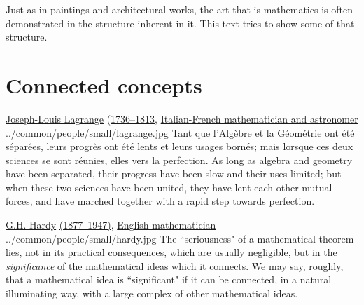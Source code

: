 Just as in paintings and architectural works, 
the art that is mathematics is often demonstrated in the structure inherent in it.
This text tries to show some of that structure.

\section*{Connected concepts}

\qboxnpqt
  { \href{http://en.wikipedia.org/wiki/Joseph_Louis_Lagrange}{Joseph-Louis Lagrange}
    (\href{http://www-history.mcs.st-andrews.ac.uk/Timelines/TimelineD.html}{1736--1813},
     \href{http://www-history.mcs.st-andrews.ac.uk/BirthplaceMaps/Places/Italy.html}{Italian-French mathematician and astronomer}
    \footnotemark
  }
  {../common/people/small/lagrange.jpg}
  {Tant que l'Alg\`ebre et la G\'eom\'etrie ont \'et\'e s\'epar\'ees,
   leurs progr\`es ont \'et\'e lents et leurs usages born\'es;
   mais lorsque ces deux sciences se sont r\'eunies, elles vers la perfection.}
  {As long as algebra and geometry have been separated,
   their progress have been slow and their uses limited;
   but when these two sciences have been united, they have lent each other mutual forces,
   and have marched together with a rapid step towards perfection.
  }


\qboxnps
  {\href{http://en.wikipedia.org/wiki/G._H._Hardy}{G.H. Hardy}
   \href{http://www-history.mcs.st-andrews.ac.uk/Timelines/TimelineG.html}{(1877--1947)},
   \href{http://www-history.mcs.st-andrews.ac.uk/BirthplaceMaps/Places/UK.html}{English mathematician}
    \footnotemark
  }
  {../common/people/small/hardy.jpg}
  {The ``seriousness" of a mathematical theorem lies,
    not in its practical consequences,
    which are usually negligible,
    but in the {\em significance} of the mathematical ideas which it connects.
    We may say, roughly, that a mathematical idea is ``significant" if it can be
    connected, in a natural illuminating way,
    with a large complex of other mathematical ideas.}


